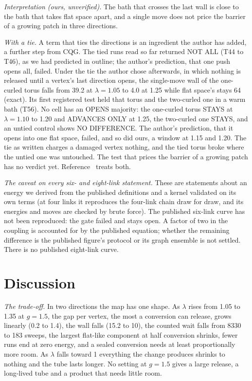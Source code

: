 \documentclass[aps,pre,10pt,twocolumn,superscriptaddress,nofootinbib]{revtex4-2}
\begin{document}
\emph{Interpretation (ours, unverified).} The bath that crosses the last wall is close to the bath that takes
flat space apart, and a single move does not price the barrier of a growing patch in three directions.

\emph{With a tie.} A term that ties the directions is an ingredient the author has added, a further step from
CQG. The tied runs read so far returned NOT ALL (T44 to T46), as we had predicted in outline; the author's
prediction, that one push opens all, failed. Under the tie the author chose afterwards, in which nothing is
released until a vertex's last direction opens, the single-move wall of the one-curled torus falls from 39.2 at
$\lambda=1.05$ to 4.0 at 1.25 while flat space's stays 64 (exact). Its first registered test held that torus and
the two-curled one in a warm bath (T56). No cell has an OPENS majority: the one-curled torus STAYS at
$\lambda=1.10$ to 1.20 and ADVANCES ONLY at 1.25, the two-curled one STAYS, and an untied control shows NO
DIFFERENCE. The author's prediction, that it opens into one flat space, failed, and so did ours, a window at 1.15
and 1.20. The tie as written charges a damaged vertex nothing, and the tied torus broke where the untied one was
untouched. The test that prices the barrier of a growing patch has no verdict yet. Reference~\cite{paper5} treats
both.

\emph{The caveat on every six- and eight-link statement.} These are statements about an energy we derived from
the published definitions and a kernel validated on its own terms (at four links it reproduces the four-link
chain draw for draw, and its energies and moves are checked by brute force). The published six-link curve
\cite{T22} has not been reproduced: the gate failed and stays open. A factor of two in the coupling is accounted
for by the published equation; whether the remaining difference is the published figure's protocol or its graph
ensemble is not settled. There is no published eight-link curve.

\section{Discussion}

\emph{The trade-off.} In two directions the map has one shape. As $\lambda$ rises from 1.05 to 1.35 at $g=1.5$,
the gap per vertex, the most a conversion can release, grows linearly (0.2 to 1.4), the wall falls (15.2 to
10), the counted wait falls from
8330 to 183 sweeps, the largest flat-like component at half conversion shrinks, fewer runs end at zero energy,
and a sealed conversion needs at least proportionally more room. As $\lambda$ falls toward 1 everything the
change produces shrinks to nothing and the tube lasts longer. No setting at $g=1.5$ gives a large release, a
long-lived tube and a product that needs little room.
\end{document}
